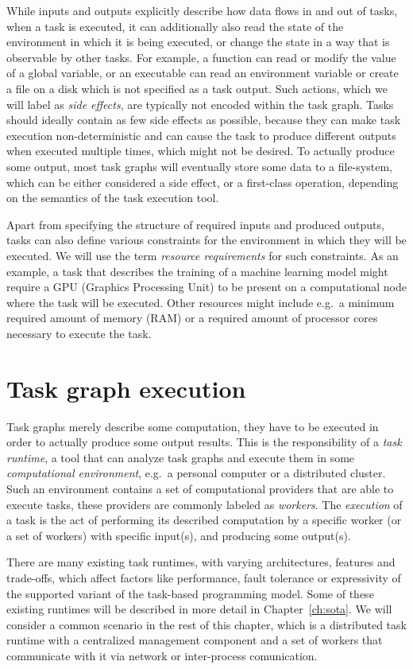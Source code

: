 While inputs and outputs explicitly describe how data flows in and out of tasks, when a task is
executed, it can additionally also read the state of the environment in which it is being executed,
or change the state in a way that is observable by other tasks. For example, a function can read or
modify the value of a global variable, or an executable can read an environment variable or create
a file on a disk which is not specified as a task output. Such actions, which we will label as
\emph{side effects}, are typically not encoded within the task graph. Tasks should ideally
contain as few side effects as possible, because they can make task execution non-deterministic and
can cause the task to produce different outputs when executed multiple times, which might not be
desired. To actually produce some output, most task graphs will eventually store some data to a
file-system, which can be either considered a side effect, or a first-class operation, depending on
the semantics of the task execution tool.

Apart from specifying the structure of required inputs and produced outputs, tasks can also define
various constraints for the environment in which they will be executed. We will use the term
\emph{resource requirements} for such constraints. As an example, a task that describes the training of a
machine learning model might require a GPU (Graphics Processing Unit) to be present on a
computational node where the task will be executed. Other resources might include e.g.\ a minimum
required amount of memory (RAM) or a required amount of processor cores necessary to execute the
task.


\section{Task graph execution}
Task graphs merely describe some computation, they have to be executed in order to actually produce
some output results. This is the responsibility of a \emph{task runtime}, a tool that can
analyze task graphs and execute them in some \emph{computational environment}, e.g.\ a personal computer or a
distributed cluster. Such an environment contains a set of computational providers that are able to
execute tasks, these providers are commonly labeled as \emph{workers}. The
\emph{execution} of a task is the act of performing its described computation by a specific
worker (or a set of workers) with specific input(s), and producing some output(s).

There are many existing task runtimes, with varying architectures, features and trade-offs, which
affect factors like performance, fault tolerance or expressivity of the supported variant of the
task-based programming model. Some of these existing runtimes will be described in more detail in
Chapter~\ref{ch:sota}. We will consider a common scenario in the rest of this chapter,
which is a distributed task runtime with a centralized management component and a set of workers
that communicate with it via network or inter-process comunication.

